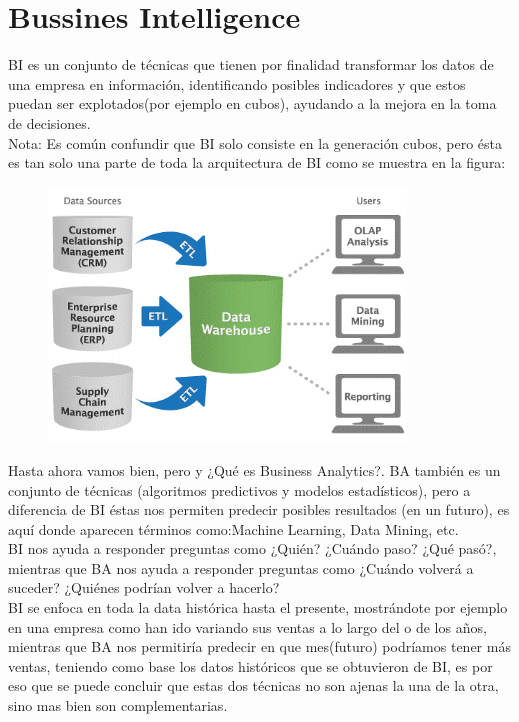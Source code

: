 \documentclass[preprint,12pt]{elsarticle}
\begin{document}
	\newpage
	
	\section{Bussines Intelligence}
	\label{S:2}
	
	BI es un conjunto de técnicas que tienen por finalidad transformar los datos de una empresa en información, identificando posibles indicadores y que estos puedan ser explotados(por ejemplo en cubos), ayudando a la mejora en la toma de decisiones.\\
	
	Nota: Es común confundir que BI solo consiste en la generación cubos, pero ésta es tan solo una parte de toda la arquitectura de BI como se muestra en la figura:
	\begin{figure}[htb]
		\begin{center}
			\includegraphics[width=9.5cm]{./Imagenes/img3}
		\end{center}
	\end{figure}
	
	Hasta ahora vamos bien, pero y ¿Qué es Business Analytics?. BA también es un conjunto de técnicas (algoritmos predictivos y modelos estadísticos), pero a diferencia de BI éstas nos permiten predecir posibles resultados (en un futuro), es aquí donde aparecen términos como:Machine Learning, Data Mining, etc.\\
	
	BI nos ayuda a responder preguntas como ¿Quién? ¿Cuándo paso? ¿Qué pasó?, mientras que BA nos ayuda a responder preguntas como ¿Cuándo volverá a suceder?  ¿Quiénes podrían volver a hacerlo?\\
	
	BI se enfoca en toda la data histórica hasta el presente, mostrándote por ejemplo en una empresa como han ido variando sus ventas a lo largo del o de los años, mientras que BA nos permitiría predecir en que mes(futuro) podríamos tener más ventas, teniendo como base los datos históricos que se obtuvieron de BI, es por eso que se puede concluir que estas dos técnicas no son ajenas la una de la otra, sino mas bien son complementarias.\cite{bib01:BI:Online}
		
\end{document}
